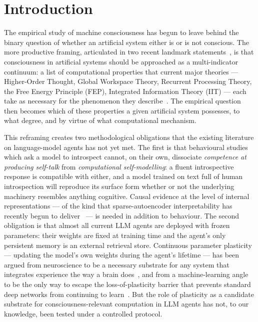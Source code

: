 \documentclass[pdflatex,sn-mathphys-num]{sn-jnl}
\theoremstyle{thmstyleone}
\theoremstyle{thmstylethree}
\begin{document}
\section{Introduction}\label{sec:intro}

The empirical study of machine consciousness has begun to leave behind the binary question of whether an artificial system either is or is not conscious. The more productive framing, articulated in two recent landmark statements~\cite{butlin2023consciousness, ny_declaration_2024}, is that consciousness in artificial systems should be approached as a multi-indicator continuum: a list of computational properties that current major theories --- Higher-Order Thought, Global Workspace Theory, Recurrent Processing Theory, the Free Energy Principle (FEP), Integrated Information Theory (IIT) --- each take as necessary for the phenomenon they describe~\cite{butlin2023consciousness}. The empirical question then becomes which of these properties a given artificial system possesses, to what degree, and by virtue of what computational mechanism.

This reframing creates two methodological obligations that the existing literature on language-model agents has not yet met. The first is that behavioural studies which ask a model to introspect cannot, on their own, dissociate \emph{competence at producing self-talk} from \emph{computational self-modelling}: a fluent introspective response is compatible with either, and a model trained on text full of human introspection will reproduce its surface form whether or not the underlying machinery resembles anything cognitive. Causal evidence at the level of internal representations --- of the kind that sparse-autoencoder interpretability has recently begun to deliver~\cite{templeton2024scaling} --- is needed in addition to behaviour. The second obligation is that almost all current LLM agents are deployed with frozen parameters: their weights are fixed at training time and the agent's only persistent memory is an external retrieval store. Continuous parameter plasticity --- updating the model's own weights during the agent's lifetime --- has been argued from neuroscience to be a necessary substrate for any system that integrates experience the way a brain does~\cite{friston2022active, christov2025embodiment}, and from a machine-learning angle to be the only way to escape the loss-of-plasticity barrier that prevents standard deep networks from continuing to learn~\cite{dohare2023plasticity, joudaki2025barriers}. But the role of plasticity as a candidate substrate for consciousness-relevant computation in LLM agents has not, to our knowledge, been tested under a controlled protocol.
\end{document}
